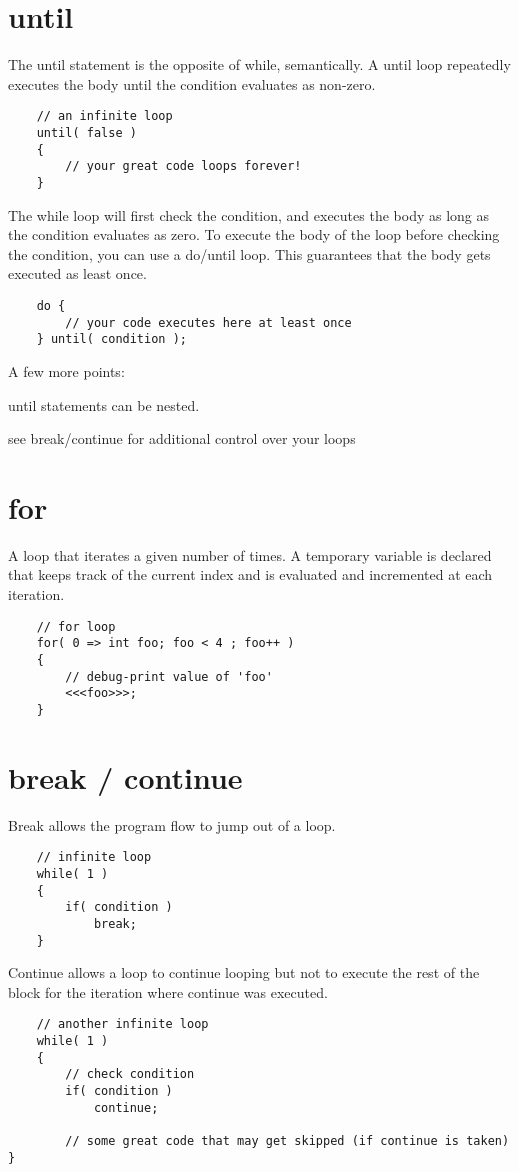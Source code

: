 \section{until}

The until statement is the opposite of while, semantically. A until loop repeatedly executes the body until the condition evaluates as non-zero.
\begin{verbatim}
    // an infinite loop
    until( false )
    {
        // your great code loops forever!
    }
\end{verbatim}

The while loop will first check the condition, and executes the body as long as the condition evaluates as zero. To execute the body of the loop before checking the condition, you can use a do/until loop. This guarantees that the body gets executed as least once.
\begin{verbatim}
    do {
        // your code executes here at least once
    } until( condition );
\end{verbatim}

 A few more points:
\begin{chuckitemize}
\item until statements can be nested.
\item see break/continue for additional control over your loops
\end{chuckitemize}

\section{for}

A loop that iterates a given number of times. A temporary variable is declared that keeps track of the current index and is evaluated and incremented at each iteration.
\begin{verbatim}
    // for loop
    for( 0 => int foo; foo < 4 ; foo++ )
    {
        // debug-print value of 'foo'
        <<<foo>>>;
    }
\end{verbatim}
 
\section{break / continue}

Break allows the program flow to jump out of a loop.
\begin{verbatim}
    // infinite loop
    while( 1 )
    {
        if( condition ) 
            break;
    }
\end{verbatim}

 Continue allows a loop to continue looping but not to execute the rest of the block for the iteration where continue was executed.
\begin{verbatim}
    // another infinite loop
    while( 1 )
    {
        // check condition
        if( condition )
            continue;

        // some great code that may get skipped (if continue is taken)
}
\end{verbatim}